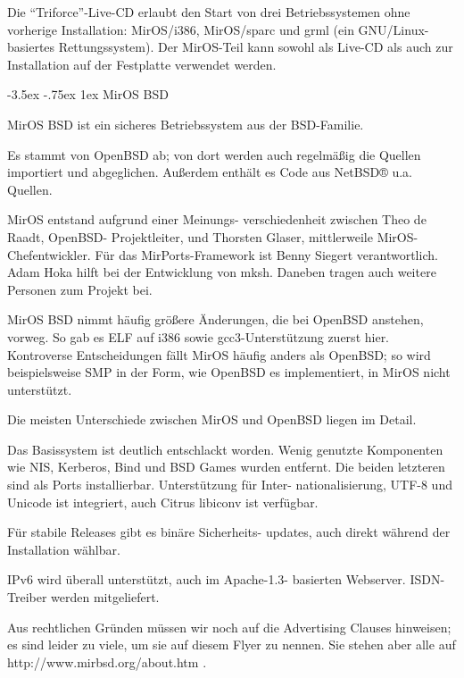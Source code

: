 \documentclass[
a4paper,landscape,%
notumble%
]{leaflet}
\makeatletter
\newcommand{\sectbox}[1]{%
 \noindent\protect\colorbox{yellow}{%
 \@tempdima=\hsize
 \advance\@tempdima by-2\fboxsep
 \advance\@tempdima by-2\fboxrule
 \protect\parbox{\@tempdima}{%
 \medskip
 \raggedright %
 #1 \medskip
}}}
\renewcommand\section{\@startsection{section}{1}{1em}%
  {-3.5ex \@plus -.75ex}%
  {1ex} %
  {\normalfont\Large\itshape\sectbox}}
\makeatother
\begin{document}
Die "`Triforce"'-Live-CD erlaubt den Start von drei Betriebssystemen ohne vorherige Installation: MirOS/i386, MirOS/sparc und grml (ein GNU/Linux-basiertes Rettungssystem). Der MirOS-Teil kann sowohl als Live-CD als auch zur Installation auf der Festplatte verwendet werden.

\newpage

\section{MirOS BSD}

{\Large MirOS BSD ist ein sicheres Betriebssystem aus der BSD-Familie.\par}

Es stammt von OpenBSD ab; von dort werden auch regelmäßig die Quellen importiert und abgeglichen. Außerdem enthält es Code aus NetBSD® u.a. Quellen.

MirOS entstand aufgrund einer Meinungs- verschiedenheit zwischen Theo de Raadt, OpenBSD- Projektleiter, und Thorsten Glaser, mittlerweile MirOS- Chefentwickler. Für das MirPorts-Framework ist Benny Siegert verantwortlich. Adam Hoka hilft bei der Entwicklung von mksh. Daneben tragen auch weitere Personen zum Projekt bei.

MirOS BSD nimmt häufig größere Änderungen, die bei OpenBSD anstehen, vorweg. So gab es ELF auf i386 sowie gcc3-Unterstützung zuerst hier. Kontroverse Entscheidungen fällt MirOS häufig anders als OpenBSD; so wird beispielsweise SMP in der Form, wie OpenBSD es implementiert, in MirOS nicht unterstützt.

Die meisten Unterschiede zwischen MirOS und OpenBSD liegen im Detail.

Das Basissystem ist deutlich entschlackt worden. Wenig genutzte Komponenten wie NIS, Kerberos, Bind und BSD Games wurden entfernt. Die beiden letzteren sind als Ports installierbar. Unterstützung für Inter- nationalisierung, UTF-8 und Unicode ist integriert, auch Citrus libiconv ist verfügbar.

Für stabile Releases gibt es binäre Sicherheits- updates, auch direkt während der Installation wählbar.

IPv6 wird überall unterstützt, auch im Apache-1.3- basierten Webserver. ISDN-Treiber werden mitgeliefert.

Aus rechtlichen Gründen müssen wir noch auf die Advertising Clauses hinweisen; es sind leider zu viele, um sie auf diesem Flyer zu nennen. Sie stehen aber alle
auf http://www.mirbsd.org/about.htm .
\end{document}
